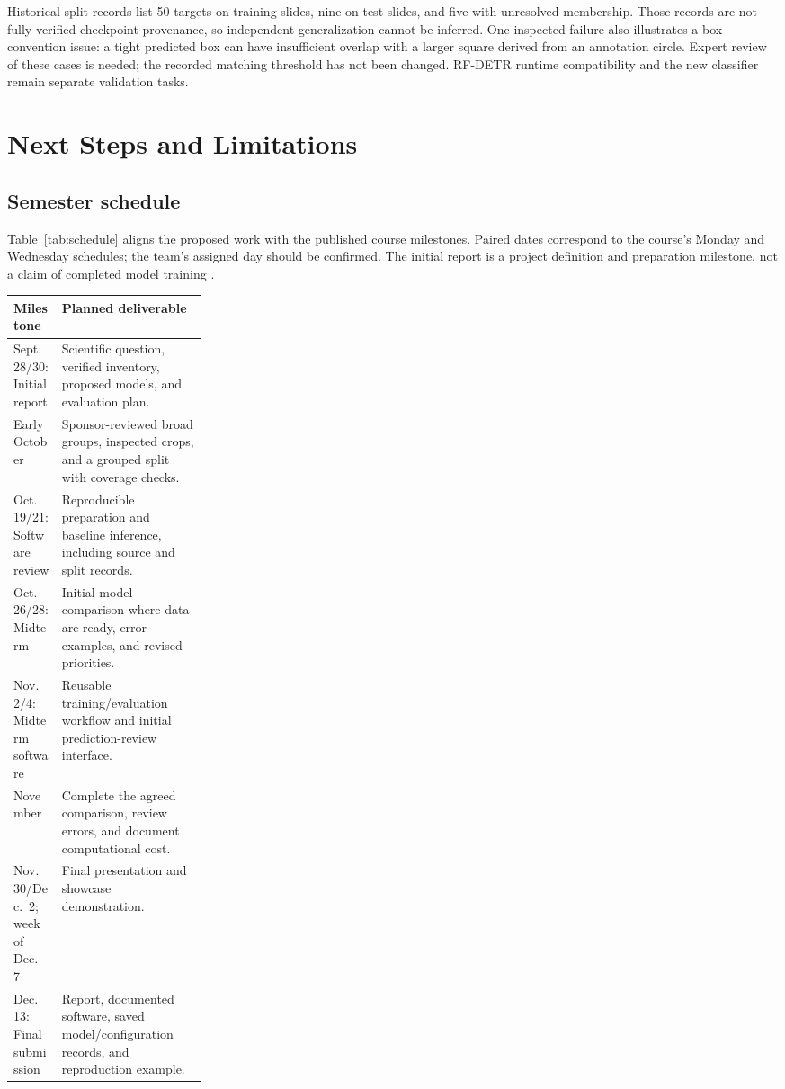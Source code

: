 \documentclass[11pt,letterpaper]{article}
\begin{document}
Historical split records list 50 targets on training slides, nine on test slides, and five with unresolved membership. Those records are not fully verified checkpoint provenance, so independent generalization cannot be inferred. One inspected failure also illustrates a box-convention issue: a tight predicted box can have insufficient overlap with a larger square derived from an annotation circle. Expert review of these cases is needed; the recorded matching threshold has not been changed. RF-DETR runtime compatibility and the new classifier remain separate validation tasks.

\section{Next Steps and Limitations}
\subsection{Semester schedule}
Table~\ref{tab:schedule} aligns the proposed work with the published course milestones. Paired dates correspond to the course's Monday and Wednesday schedules; the team's assigned day should be confirmed. The initial report is a project definition and preparation milestone, not a claim of completed model training \citep{syllabus2026}.

\begin{center}
\begin{minipage}{\linewidth}
\label{tab:schedule}
\begin{tabularx}{\linewidth}{p{0.25\linewidth}Y}
\toprule
Milestone & Planned deliverable \\
\midrule
Sept.\ 28/30: Initial report & Scientific question, verified inventory, proposed models, and evaluation plan. \\
Early October & Sponsor-reviewed broad groups, inspected crops, and a grouped split with coverage checks. \\
Oct.\ 19/21: Software review & Reproducible preparation and baseline inference, including source and split records. \\
Oct.\ 26/28: Midterm & Initial model comparison where data are ready, error examples, and revised priorities. \\
Nov.\ 2/4: Midterm software & Reusable training/evaluation workflow and initial prediction-review interface. \\
November & Complete the agreed comparison, review errors, and document computational cost. \\
Nov.\ 30/Dec.\ 2; week of Dec.\ 7 & Final presentation and showcase demonstration. \\
Dec.\ 13: Final submission & Report, documented software, saved model/configuration records, and reproduction example. \\
\bottomrule
\end{tabularx}
\end{minipage}
\end{center}
\end{document}
